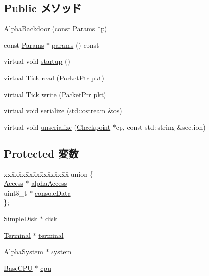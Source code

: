 \subsection*{Public メソッド}
\begin{DoxyCompactItemize}
\item 
\hyperlink{classAlphaBackdoor_aa3df553820be57af9fef79cf8c933afa}{AlphaBackdoor} (const \hyperlink{classAlphaBackdoor_a3311d1ef17b579d409e4cf342f9c696f}{Params} $\ast$p)
\item 
const \hyperlink{classAlphaBackdoor_a3311d1ef17b579d409e4cf342f9c696f}{Params} $\ast$ \hyperlink{classAlphaBackdoor_acd3c3feb78ae7a8f88fe0f110a718dff}{params} () const 
\item 
virtual void \hyperlink{classAlphaBackdoor_aecc7d8debf54990ffeaaed5bac7d7d81}{startup} ()
\item 
virtual \hyperlink{classm5_1_1params_1_1Tick}{Tick} \hyperlink{classAlphaBackdoor_a613ec7d5e1ec64f8d21fec78ae8e568e}{read} (\hyperlink{classPacket}{PacketPtr} pkt)
\item 
virtual \hyperlink{classm5_1_1params_1_1Tick}{Tick} \hyperlink{classAlphaBackdoor_a4cefab464e72b5dd42c003a0a4341802}{write} (\hyperlink{classPacket}{PacketPtr} pkt)
\item 
virtual void \hyperlink{classAlphaBackdoor_ad6272f80ae37e8331e3969b3f072a801}{serialize} (std::ostream \&os)
\item 
virtual void \hyperlink{classAlphaBackdoor_af22e5d6d660b97db37003ac61ac4ee49}{unserialize} (\hyperlink{classCheckpoint}{Checkpoint} $\ast$cp, const std::string \&section)
\end{DoxyCompactItemize}
\subsection*{Protected 変数}
\begin{DoxyCompactItemize}
\item 
\begin{tabbing}
xx\=xx\=xx\=xx\=xx\=xx\=xx\=xx\=xx\=\kill
union \{\\
\>\hyperlink{structAlphaBackdoor_1_1Access}{Access} $\ast$ \hyperlink{classAlphaBackdoor_a1800e69c50cf6e59ebb8fcd881caf482}{alphaAccess}\\
\>uint8\_t $\ast$ \hyperlink{classAlphaBackdoor_ab2f889c072e672bb334695bb8a796d55}{consoleData}\\
\}; \\

\end{tabbing}\item 
\hyperlink{classSimpleDisk}{SimpleDisk} $\ast$ \hyperlink{classAlphaBackdoor_a7a34a11311e1d03257d51166e64c9a9f}{disk}
\item 
\hyperlink{classTerminal}{Terminal} $\ast$ \hyperlink{classAlphaBackdoor_ad511a78bad32e194354d8323bc23a4e3}{terminal}
\item 
\hyperlink{classAlphaSystem}{AlphaSystem} $\ast$ \hyperlink{classAlphaBackdoor_a33258b14e97cdadc0a00878bba22adda}{system}
\item 
\hyperlink{classBaseCPU}{BaseCPU} $\ast$ \hyperlink{classAlphaBackdoor_a7a31ca9fefb2fe821f29a270678912db}{cpu}
\end{DoxyCompactItemize}


